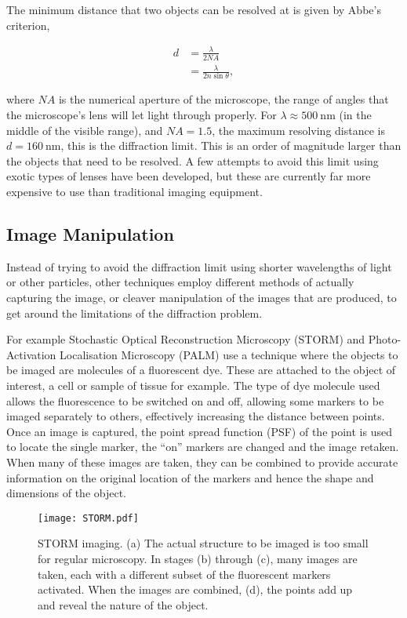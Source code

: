 The minimum distance that two objects can be resolved at is given by Abbe's
criterion,

\begin{align}
	d &= \frac{\lambda}{2N\!A} \\
	  &= \frac{\lambda}{2n\sin\theta},
\end{align}

where $N\!A$ is the numerical aperture of the microscope, the range of angles
that the microscope's lens will let light through properly. For $\lambda
\approx \SI{500}{\nano\metre}$ (in the middle of the visible range), and $N\!A =
1.5$, the maximum resolving distance is $d = \SI{160}{\nano\meter}$, this is
the diffraction limit. This is an order of magnitude larger than the objects
that need to be resolved. A few attempts to avoid this limit using exotic types
of lenses have been developed\cite{fang2005sub}, but these are currently far
more expensive to use than traditional imaging equipment.

\subsection{Image Manipulation}
\label{sub:image_manipulation}

Instead of trying to avoid the diffraction limit using shorter wavelengths of
light or other particles, other techniques employ different methods of actually
capturing the image, or cleaver manipulation of the images that are produced,
to get around the limitations of the diffraction problem.

For example Stochastic Optical Reconstruction Microscopy (STORM)
\cite{rust2006sub} and Photo-Activation Localisation Microscopy
(PALM)\cite{owen2010palm} use a technique where the objects to be imaged are
molecules of a fluorescent dye. These are attached to the object of interest, a
cell or sample of tissue for example. The type of dye molecule used allows the
fluorescence to be switched on and off, allowing some markers to be imaged
separately to others, effectively increasing the distance between points. Once
an image is captured, the point spread function (PSF) of the point is used to
locate the single marker, the ``on'' markers are changed and the image retaken.
When many of these images are taken, they can be combined to provide accurate
information on the original location of the markers and hence the shape and
dimensions of the object.

\begin{figure}[tbhp]
	\centering
	\texttt{[image: STORM.pdf]}

	\caption[Creation of a STORM image.]{STORM imaging. (a) The actual
		structure to be imaged is too small for regular microscopy. In stages
		(b) through (c), many images are taken, each with a different subset of
		the fluorescent markers activated. When the images are combined, (d),
		the points add up and reveal the nature of the object.}\label{fig:STORM}
\end{figure}

